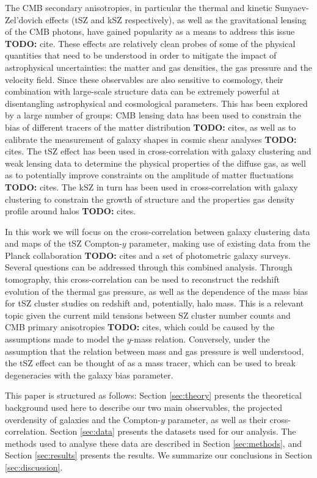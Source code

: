 \documentclass[useAMS,usenatbib]{mn2e}
\newcommand{\TODO}[1]{{\bf TODO:} #1}
\newcommand{\todo}[1]{{\bf TODO:} #1}
\begin{document}
  The CMB secondary anisotropies, in particular the thermal and kinetic Sunyaev-Zel'dovich effects (tSZ and kSZ respectively), as well as the gravitational lensing of the CMB photons, have gained popularity as a means to address this issue \TODO{cite}. These effects are relatively clean probes of some of the physical quantities that need to be understood in order to mitigate the impact of astrophysical uncertainties: the matter and gas densities, the gas pressure and the velocity field. Since these observables are also sensitive to cosmology, their combination with large-scale structure data can be extremely powerful at disentangling astrophysical and cosmological parameters. This has been explored by a large number of groups: CMB lensing data has been used to constrain the bias of different tracers of the matter distribution \todo{cites}, as well as to calibrate the measurement of galaxy shapes in cosmic shear analyses \todo{cites}. The tSZ effect has been used in cross-correlation with galaxy clustering and weak lensing data to determine the physical properties of the diffuse gas, as well as to potentially improve constraints on the amplitude of matter fluctuations \todo{cites}. The kSZ in turn has been used in cross-correlation with galaxy clustering to constrain the growth of structure and the properties gas density profile around halos \todo{cites}.
  
  In this work we will focus on the cross-correlation between galaxy clustering data and maps of the tSZ Compton-$y$ parameter, making use of existing data from the Planck collaboration \todo{cites} and a set of photometric galaxy surveys. Several questions can be addressed through this combined analysis. Through tomography, this cross-correlation can be used to reconstruct the redshift evolution of the thermal gas pressure, as well as the dependence of the mass bias for tSZ cluster studies on redshift and, potentially, halo mass. This is a relevant topic given the current mild tensions between SZ cluster number counts and CMB primary anisotropies \todo{cites}, which could be caused by the assumptions made to model the $y$-mass relation. Conversely, under the assumption that the relation between mass and gas pressure is well understood, the tSZ effect can be thought of as a mass tracer, which can be used to break degeneracies with the galaxy bias parameter.

  This paper is structured as follows: Section \ref{sec:theory} presents the theoretical background used here to describe our two main observables, the projected overdensity of galaxies and the Compton-$y$ parameter, as well as their cross-correlation. Section \ref{sec:data} presents the datasets used for our analysis. The methods used to analyse these data are described in Section \ref{sec:methods}, and Section \ref{sec:results} presents the results. We summarize our conclusions in Section \ref{sec:discussion}.
\end{document}

